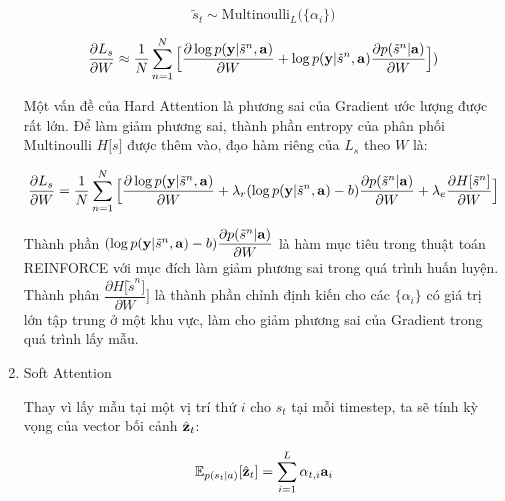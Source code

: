 \documentclass[14pt, a4paper]{article}
\numberwithin{equation}{section}
\numberwithin{algorithm}{section}
\numberwithin{figure}{section}
\numberwithin{table}{section}
\numberwithin{dl}{section}
\numberwithin{md}{section}
\numberwithin{bd}{section}
\numberwithin{dn}{section}
\numberwithin{hq}{section}
\begin{document}
\begin{enumerate}[label=(\alph*)]
        \begin{equation}
            \tilde{s}_t \sim \mathrm{Multinoulli}_L \big(\lbrace \alpha_i \big\rbrace)
        \end{equation}

        \begin{equation}
            \dfrac{\partial L_s}{\partial W} \approx \dfrac{1}{N}\sum_{n=1}^N \Big\lbrack \dfrac{\partial \log p(\bold{y} \vert \tilde{s}^n, \bold{a})}{\partial W} + \log p(\bold{y} \vert \tilde{s}^n, \bold{a}) \dfrac{\partial p(\tilde{s}^n \vert \bold{a})}{\partial W} \Big\rbrack)
        \end{equation}

        Một vấn đề của Hard Attention là phương sai của Gradient ước lượng được rất lớn.
        Để làm giảm phương sai, thành phần entropy của phân phối Multinoulli $H \lbrack s \rbrack$ được thêm vào, đạo hàm riêng của $L_s$ theo $W$ là:

        \begin{equation}
            \dfrac{\partial L_s}{\partial W}=\dfrac{1}{N}\sum_{n=1}^N \Big\lbrack \dfrac{\partial \log p(\bold{y} \vert \tilde{s}^n, \bold{a})}{\partial W} + \lambda_r (\log p(\bold{y} \vert \tilde{s}^n, \bold{a}) - b)\dfrac{\partial p(\tilde{s}^n \vert \bold{a})}{\partial W} + \lambda_e \dfrac{\partial H \lbrack \tilde{s}^n \rbrack}{\partial W} \Big \rbrack
        \end{equation}

        Thành phần $(\log p(\bold{y} \vert \tilde{s}^n, \bold{a}) - b)\dfrac{\partial p(\tilde{s}^n \vert \bold{a})}{\partial W}$ là hàm mục tiêu trong thuật toán REINFORCE \cite{williams1992simple} với mục đích làm giảm phương sai trong quá trình huấn luyện.
        Thành phân $\dfrac{\partial H \lbrack \tilde{s}^n \rbrack}{\partial W} \Big \rbrack$ là thành phần chỉnh định kiến cho các $\lbrace \alpha_i \rbrace$ có giá trị lớn tập trung ở một khu vực, làm cho giảm phương sai của Gradient trong quá trình lấy mẫu.

        \item Soft Attention
        
        Thay vì lấy mẫu tại một vị trí thứ $i$ cho $s_t$ tại mỗi timestep, ta sẽ tính kỳ vọng của vector bối cảnh $\hat{\bold{z}}_t$:

        \begin{equation}
            \mathbb{E}_{p(s_t \vert a)}\lbrack \hat{\bold{z}}_t \rbrack=\sum_{i=1}^L \alpha_{t,i}\bold{a}_i
        \end{equation}


\end{enumerate}
\end{document}
